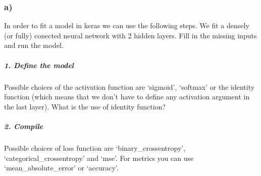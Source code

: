 \documentclass[]{article}
\newenvironment{Shaded}{\begin{snugshade}}{\end{snugshade}}
\newcommand{\CommentTok}[1]{\textcolor[rgb]{0.56,0.35,0.01}{\textit{#1}}}
\newcommand{\DataTypeTok}[1]{\textcolor[rgb]{0.13,0.29,0.53}{#1}}
\newcommand{\DecValTok}[1]{\textcolor[rgb]{0.00,0.00,0.81}{#1}}
\newcommand{\KeywordTok}[1]{\textcolor[rgb]{0.13,0.29,0.53}{\textbf{#1}}}
\newcommand{\NormalTok}[1]{#1}
\newcommand{\OperatorTok}[1]{\textcolor[rgb]{0.81,0.36,0.00}{\textbf{#1}}}
\newcommand{\StringTok}[1]{\textcolor[rgb]{0.31,0.60,0.02}{#1}}
\let\oldsubparagraph\subparagraph
\renewcommand{\subparagraph}[1]{\oldsubparagraph{#1}\mbox{}}
\begin{document}
\hypertarget{a-3}{%
\subsubsection{a)}\label{a-3}}

In order to fit a model in keras we can use the following steps. We fit
a densely (or fully) conected neural network with 2 hidden layers. Fill
in the missing inputs and run the model.

\hypertarget{define-the-model}{%
\subparagraph{1. Define the model}\label{define-the-model}}

\begin{Shaded}
\end{Shaded}

Possible choices of the activation function are `sigmoid', `softmax' or
the identity function (which means that we don't have to define any
activation argument in the last layer). What is the use of identity
function?

\hypertarget{compile}{%
\subparagraph{2. Compile}\label{compile}}

\begin{Shaded}
\end{Shaded}

Possible choices of loss function are `binary\_crossentropy',
`categorical\_crossentropy' and `mse'. For metrics you can use
`mean\_absolute\_error' or `accuracy'.
\end{document}
